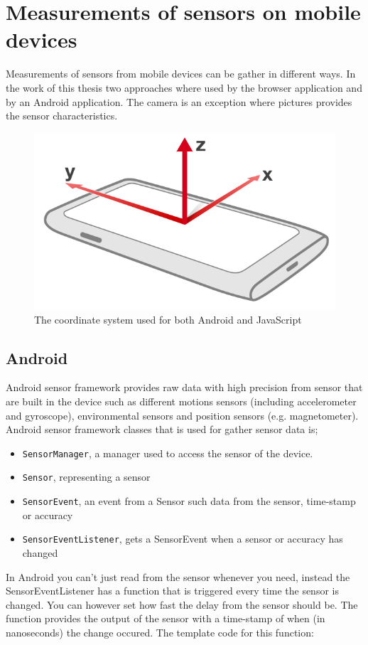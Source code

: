 \section{Measurements of sensors on mobile devices}
Measurements of sensors from mobile devices can be gather in different ways. In the work of this thesis two approaches where used by the browser application and by an Android application. The camera is an exception where pictures provides the sensor characteristics.
\begin{figure}[H]
	\centering
    \includegraphics[scale=0.2]{img/device-axes}
    \caption{The coordinate system used for both Android and JavaScript\cite[]{sensor:DeviceOrientation:spec}}
  \label{fig:device-axes}
\end{figure}

\subsection{Android}
Android sensor framework provides raw data with high precision from sensor that are built in the device such as different motions sensors (including accelerometer and gyroscope), environmental sensors and position sensors (e.g. magnetometer). \cite[]{android:sensor}
Android sensor framework classes that is used for gather sensor data is; 
\begin{itemize}
	\item[] \texttt{SensorManager}, a manager used to access the sensor of the device. 
	\item[] \texttt{Sensor}, representing a sensor
	\item[] \texttt{SensorEvent}, an event from a Sensor such data from the sensor, time-stamp or accuracy
	\item[] \texttt{SensorEventListener}, gets a SensorEvent when a sensor or accuracy has changed 
\end{itemize}
In Android you can't just read from the sensor whenever you need, instead the SensorEventListener has a function that is triggered every time the sensor is changed. You can however set how fast the delay from the sensor should be. The function provides the output of the sensor with a time-stamp of when (in nanoseconds) the change occured. The template code for this function:
\label{code:androidSensor}
\cite[]{android:sensorEvent} 




